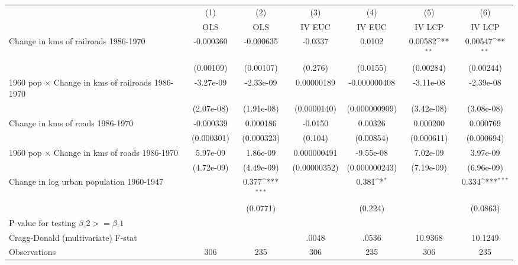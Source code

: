 {
\def\sym#1{\ifmmode^{#1}\else\(^{#1}\)\fi}
\begin{tabular}{l*{6}{c}}
\hline\hline
                &\multicolumn{1}{c}{(1)}&\multicolumn{1}{c}{(2)}&\multicolumn{1}{c}{(3)}&\multicolumn{1}{c}{(4)}&\multicolumn{1}{c}{(5)}&\multicolumn{1}{c}{(6)}\\
                &\multicolumn{1}{c}{OLS}&\multicolumn{1}{c}{OLS}&\multicolumn{1}{c}{IV EUC}&\multicolumn{1}{c}{IV EUC}&\multicolumn{1}{c}{IV LCP}&\multicolumn{1}{c}{IV LCP}\\
\hline
Change in kms of railroads 1986-1970&-0.000360         &-0.000635         &  -0.0337         &   0.0102         &  0.00582\sym{**} &  0.00547\sym{**} \\
                &(0.00109)         &(0.00107)         &  (0.276)         & (0.0155)         &(0.00284)         &(0.00244)         \\
[1em]
1960 pop $\times$ Change in kms of railroads 1986-1970&-3.27e-09         &-2.33e-09         &0.00000189         &-0.000000408         &-3.11e-08         &-2.39e-08         \\
                &(2.07e-08)         &(1.91e-08)         &(0.0000140)         &(0.000000909)         &(3.42e-08)         &(3.08e-08)         \\
[1em]
Change in kms of roads 1986-1970&-0.000339         & 0.000186         &  -0.0150         &  0.00326         & 0.000200         & 0.000769         \\
                &(0.000301)         &(0.000323)         &  (0.104)         &(0.00854)         &(0.000611)         &(0.000694)         \\
[1em]
1960 pop $\times$ Change in kms of roads 1986-1970& 5.97e-09         & 1.86e-09         &0.000000491         &-9.55e-08         & 7.02e-09         & 3.97e-09         \\
                &(4.72e-09)         &(4.49e-09)         &(0.00000352)         &(0.000000243)         &(7.19e-09)         &(6.96e-09)         \\
[1em]
Change in log urban population 1960-1947&                  &    0.377\sym{***}&                  &    0.381\sym{*}  &                  &    0.334\sym{***}\\
                &                  & (0.0771)         &                  &  (0.224)         &                  & (0.0863)         \\
\hline
P-value for testing $\beta\_{2} >= \beta\_{1}$&                  &                  &                  &                  &                  &                  \\
Cragg-Donald (multivariate) F-stat&                  &                  &    .0048         &    .0536         &  10.9368         &  10.1249         \\
Observations    &      306         &      235         &      306         &      235         &      306         &      235         \\
\hline\hline
\end{tabular}
}
